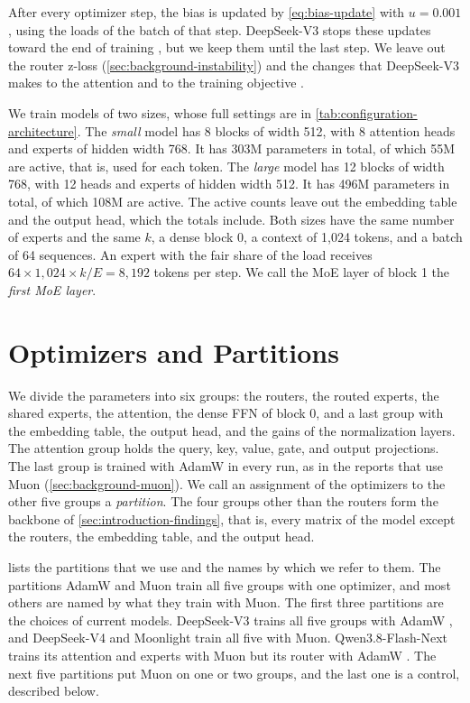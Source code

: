 After every optimizer step, the bias is updated by \cref{eq:bias-update} with $u = 0.001$, using the loads of the batch of that step. DeepSeek-V3 stops these updates toward the end of training \cite{deepseek2024v3}, but we keep them until the last step. We leave out the router z-loss (\cref{sec:background-instability}) and the changes that DeepSeek-V3 makes to the attention and to the training objective \cite{deepseek2024v3}.

We train models of two sizes, whose full settings are in \cref{tab:configuration-architecture}. The \emph{small} model has 8 blocks of width 512, with 8 attention heads and experts of hidden width 768. It has 303M parameters in total, of which 55M are active, that is, used for each token. The \emph{large} model has 12 blocks of width 768, with 12 heads and experts of hidden width 512. It has 496M parameters in total, of which 108M are active. The active counts leave out the embedding table and the output head, which the totals include. Both sizes have the same number of experts and the same $k$, a dense block 0, a context of 1,024 tokens, and a batch of 64 sequences. An expert with the fair share of the load receives $64 \times 1{,}024 \times k / E = 8{,}192$ tokens per step. We call the MoE layer of block 1 the \emph{first MoE layer}.

\section{Optimizers and Partitions}
\label{sec:method-optimizers}
We divide the parameters into six groups: the routers, the routed experts, the shared experts, the attention, the dense FFN of block 0, and a last group with the embedding table, the output head, and the gains of the normalization layers. The attention group holds the query, key, value, gate, and output projections. The last group is trained with AdamW in every run, as in the reports that use Muon (\cref{sec:background-muon}). We call an assignment of the optimizers to the other five groups a \emph{partition}. The four groups other than the routers form the backbone of \cref{sec:introduction-findings}, that is, every matrix of the model except the routers, the embedding table, and the output head.

 lists the partitions that we use and the names by which we refer to them. The partitions AdamW and Muon train all five groups with one optimizer, and most others are named by what they train with Muon. The first three partitions are the choices of current models. DeepSeek-V3 trains all five groups with AdamW \cite{deepseek2024v3}, and DeepSeek-V4 \cite{deepseek2026v4} and Moonlight \cite{liu2025moonlight} train all five with Muon. Qwen3.8-Flash-Next trains its attention and experts with Muon but its router with AdamW \cite{qiu2026qwennext}. The next five partitions put Muon on one or two groups, and the last one is a control, described below.

